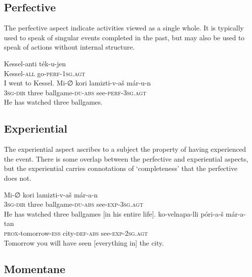 \documentclass[grammar]{subfiles}
\begin{document}
\subsection{Perfective}
\label{vp:ssec_perfective}

The perfective aspect indicate activities viewed as a single whole.  It is
typically used to speak of singular events completed in the past, but may also
be used to speak of actions without internal structure.

\begin{exe}
  \ex {}
  \gll Kessel-anti ték-u-jen\\
  Kessel\textsc{-all} go\textsc{-perf-1sg.agt}\\
  \glt I went to Kessel.
  \ex {}
  \gll Mi-∅ kori lamizti-v-aš már-u-n\\ 
  \textsc{3sg-dir} three ballgame\textsc{-du-abs} see\textsc{-perf-3sg.agt}\\
  \glt He has watched three ballgames.
\end{exe}



\subsection{Experiential}
\label{vp:ssec_experiential}

The experiential aspect ascribes to a subject the property of having
experienced the event.  There is some overlap between the perfective and
experiential aspects, but the experiential carries connotations of
‘completeness’ that the perfective does not.   

\begin{exe}
  \ex {}
  \gll Mi-∅ kori lamizti-v-aš már-a-n\\ 
  \textsc{3sg-dir} three ballgame\textsc{-du-abs} see\textsc{-exp-3sg.agt}\\
  \glt He has watched three ballgames [in his entire life].
  \ex {}
  \gll ko-velnapa-lli póri-a-š már-a-tan\\
  \textsc{prox}-tomorrow-\textsc{ess} city\textsc{-def-abs} see\textsc{-exp-2sg.agt}\\
  \glt Tomorrow you will have seen [everything in] the city.
\end{exe}

\subsection{Momentane}
\label{vp:ssec_momentane}
\end{document}
